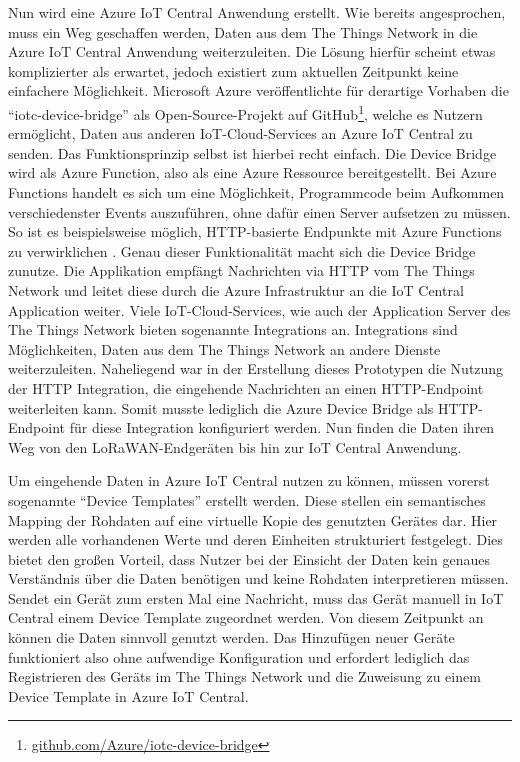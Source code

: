 Nun wird eine Azure IoT Central Anwendung erstellt. Wie bereits angesprochen, muss ein Weg geschaffen werden, Daten aus dem The Things Network in die Azure IoT Central Anwendung weiterzuleiten. Die Lösung hierfür scheint etwas komplizierter als erwartet, jedoch existiert zum aktuellen Zeitpunkt keine einfachere Möglichkeit. Microsoft Azure veröffentlichte für derartige Vorhaben die ``iotc-device-bridge'' als Open-Source-Projekt auf GitHub\footnote{\url{github.com/Azure/iotc-device-bridge}}, welche es Nutzern ermöglicht, Daten aus anderen IoT-Cloud-Services an Azure IoT Central zu senden. Das Funktionsprinzip selbst ist hierbei recht einfach. Die Device Bridge wird als Azure Function, also als eine Azure Ressource bereitgestellt. Bei Azure Functions handelt es sich um eine Möglichkeit, Programmcode beim Aufkommen verschiedenster Events auszuführen, ohne dafür einen Server aufsetzen zu müssen. So ist es beispielsweise möglich, HTTP-basierte Endpunkte mit Azure Functions zu verwirklichen . Genau dieser Funktionalität macht sich die Device Bridge zunutze. Die Applikation empfängt Nachrichten via HTTP vom The Things Network und leitet diese durch die Azure Infrastruktur an die IoT Central Application weiter. Viele IoT-Cloud-Services, wie auch der Application Server des The Things Network bieten sogenannte Integrations an. Integrations sind Möglichkeiten, Daten aus dem The Things Network an andere Dienste weiterzuleiten. Naheliegend war in der Erstellung dieses Prototypen die Nutzung der HTTP Integration, die eingehende Nachrichten an einen HTTP-Endpoint weiterleiten kann. Somit musste lediglich die Azure Device Bridge als HTTP-Endpoint für diese Integration konfiguriert werden. Nun finden die Daten ihren Weg von den LoRaWAN-Endgeräten bis hin zur IoT Central Anwendung.

Um eingehende Daten in Azure IoT Central nutzen zu können, müssen vorerst sogenannte ``Device Templates'' erstellt werden. Diese stellen ein semantisches Mapping der Rohdaten auf eine virtuelle Kopie des genutzten Gerätes dar. Hier werden alle vorhandenen Werte und deren Einheiten strukturiert festgelegt. Dies bietet den großen Vorteil, dass Nutzer bei der Einsicht der Daten kein genaues Verständnis über die Daten benötigen und keine Rohdaten interpretieren müssen. Sendet ein Gerät zum ersten Mal eine Nachricht, muss das Gerät manuell in IoT Central einem Device Template zugeordnet werden. Von diesem Zeitpunkt an können die Daten sinnvoll genutzt werden. Das Hinzufügen neuer Geräte funktioniert also ohne aufwendige Konfiguration und erfordert lediglich das Registrieren des Geräts im The Things Network und die Zuweisung zu einem Device Template in Azure IoT Central.

